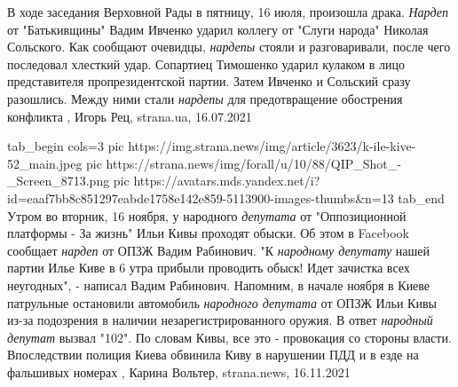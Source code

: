 В ходе заседания Верховной Рады в пятницу, 16 июля, произошла драка.
\emph{Нардеп} от "Батькивщины" Вадим Ивченко ударил коллегу от "Слуги народа"
Николая Сольского.  Как сообщают очевидцы, \emph{нардепы} стояли и
разговаривали, после чего последовал хлесткий удар.  Сопартиец Тимошенко ударил
кулаком в лицо представителя пропрезидентской партии.  Затем Ивченко и Сольский
сразу разошлись. Между ними стали \emph{нардепы} для предотвращение обострения
конфликта
, 
Игорь Рец, strana.ua, 16.07.2021

\ifcmt
  tab_begin cols=3
     pic https://img.strana.news/img/article/3623/k-ile-kive-52_main.jpeg
     pic https://strana.news/img/forall/u/10/88/QIP_Shot_-_Screen_8713.png
		 pic https://avatars.mds.yandex.net/i?id=eaaf7bb8c851297eabde1758e142e859-5113900-images-thumbs&n=13
  tab_end
\fi
Утром во вторник, 16 ноября, у народного \emph{депутата} от "Оппозиционной
платформы - За жизнь" Ильи Кивы проходят обыски.  Об этом в Facebook сообщает
\emph{нардеп} от ОПЗЖ Вадим Рабинович.  "К \emph{народному депутату} нашей
партии Илье Киве в 6 утра прибыли проводить обыск!  Идет зачистка всех
неугодных", - написал Вадим Рабинович. Напомним, в начале ноября в Киеве
патрульные остановили автомобиль \emph{народного депутата} от ОПЗЖ Ильи Кивы из-за
подозрения в наличии незарегистрированного оружия. В ответ \emph{народный депутат}
вызвал "102". По словам Кивы, все это - провокация со стороны власти.
Впоследствии полиция Киева обвинила Киву в нарушении ПДД и в езде на фальшивых
номерах 
, 
Карина Вольтер, strana.news, 16.11.2021
